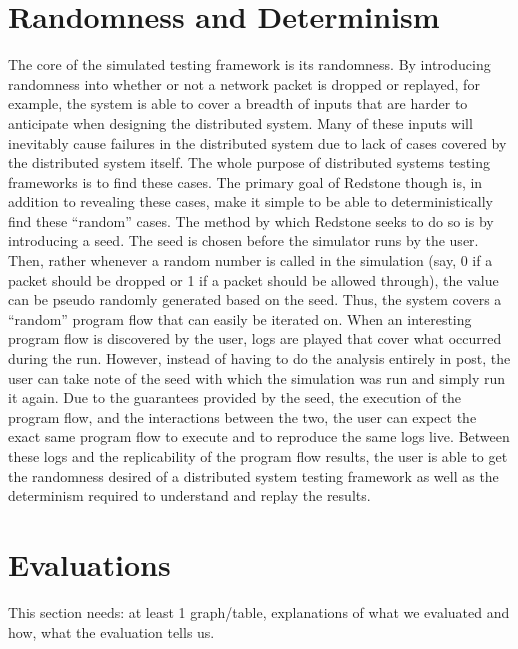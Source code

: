 \section{\txtrsdust Randomness and Determinism}

{\fontsize{12}{15}\selectfont 

The core of the simulated testing framework is its randomness. By introducing randomness into whether or not a network packet is dropped or replayed, for example, the system is able to cover a breadth of inputs that are harder to anticipate when designing the distributed system. Many of these inputs will inevitably cause failures in the distributed system due to lack of cases covered by the distributed system itself. The whole purpose of distributed systems testing frameworks is to find these cases. The primary goal of Redstone though is, in addition to revealing these cases, make it simple to be able to deterministically find these “random” cases. The method by which Redstone seeks to do so is by introducing a seed. The seed is chosen before the simulator runs by the user. Then, rather whenever a random number is called in the simulation (say, 0 if a packet should be dropped or 1 if a packet should be allowed through), the value can be pseudo randomly generated based on the seed. Thus, the system covers a “random” program flow that can easily be iterated on. When an interesting program flow is discovered by the user, logs are played that cover what occurred during the run. However, instead of having to do the analysis entirely in post, the user can take note of the seed with which the simulation was run and simply run it again. Due to the guarantees provided by the seed, the execution of the program flow, and the interactions between the two, the user can expect the exact same program flow to execute and to reproduce the same logs live. Between these logs and the replicability of the program flow results, the user is able to get the randomness desired of a distributed system testing framework as well as the determinism required to understand and replay the results.

}

\section{\txtrsdust Evaluations}

{\fontsize{12}{15}\selectfont 

This section needs: at least 1 graph/table, explanations of what we evaluated and how, what the evaluation tells us.

}

